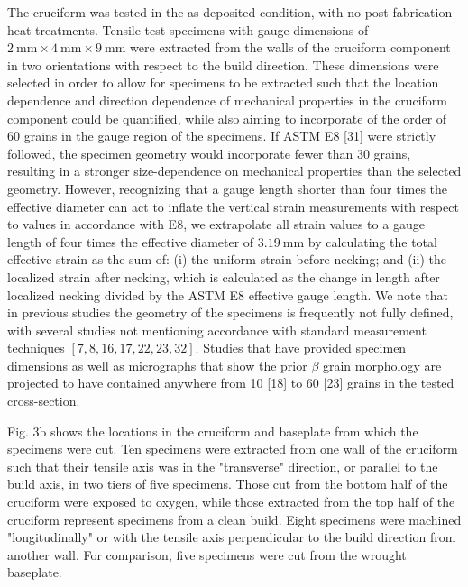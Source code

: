 \documentclass[10pt]{article}
\begin{document}
The cruciform was tested in the as-deposited condition, with no post-fabrication heat treatments. Tensile test specimens with gauge dimensions of $2 \mathrm{~mm} \times 4 \mathrm{~mm} \times 9 \mathrm{~mm}$ were extracted from the walls of the cruciform component in two orientations with respect to the build direction. These dimensions were selected in order to allow for specimens to be extracted such that the location dependence and direction dependence of mechanical properties in the cruciform component could be quantified, while also aiming to incorporate of the order of 60 grains in the gauge region of the specimens. If ASTM E8 [31] were strictly followed, the specimen geometry would incorporate fewer than 30 grains, resulting in a stronger size-dependence on mechanical properties than the selected geometry. However, recognizing that a gauge length shorter than four times the effective diameter can act to inflate the vertical strain measurements with respect to values in accordance with E8, we extrapolate all strain values to a gauge length of four times the effective diameter of $3.19 \mathrm{~mm}$ by calculating the total effective strain as the sum of: (i) the uniform strain before necking; and (ii) the localized strain after necking, which is calculated as the change in length after localized necking divided by the ASTM E8 effective gauge length. We note that in previous studies the geometry of the specimens is frequently not fully defined, with several studies not mentioning accordance with standard measurement techniques $[7,8,16,17,22,23,32]$. Studies that have provided specimen dimensions as well as micrographs that show the prior $\beta$ grain morphology are projected to have contained anywhere from 10 [18] to 60 [23] grains in the tested cross-section.

Fig. 3b shows the locations in the cruciform and baseplate from which the specimens were cut. Ten specimens were extracted from one wall of the cruciform such that their tensile axis was in the "transverse" direction, or parallel to the build axis, in two tiers of five specimens. Those cut from the bottom half of the cruciform were exposed to oxygen, while those extracted from the top half of the\\
cruciform represent specimens from a clean build. Eight specimens were machined "longitudinally" or with the tensile axis perpendicular to the build direction from another wall. For comparison, five specimens were cut from the wrought baseplate.
\end{document}
